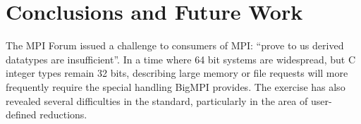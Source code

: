 
\section{Conclusions and Future Work}

The MPI Forum issued a challenge to consumers of MPI: ``prove to us derived
datatypes are insufficient''.  In a time where 64 bit systems are widespread,
but C integer types remain 32 bits, describing large memory or file requests
will more frequently require the special handling BigMPI provides.  The
exercise has also revealed several difficulties in the standard, particularly
in the area of user-defined reductions.


